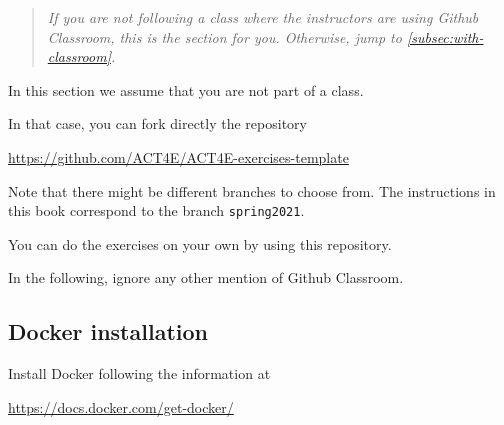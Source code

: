 \begin{quote}
  \emph{
    If you are \emph{not} following a class where the instructors are using Github Classroom,
    this is the section for you. Otherwise, jump to \cref{subsec:with-classroom}.
  }
\end{quote}

In this section we assume that you are not part of a class.

In that case, you can fork directly the repository

\url{https://github.com/ACT4E/ACT4E-exercises-template}

Note that there might be different branches to choose from. The instructions in this book correspond to
the branch \texttt{spring2021}.

You can do the exercises on your own by using this repository.

In the following, ignore any other mention of Github Classroom.

\subsection{Docker installation}

Install Docker following the information at

\url{https://docs.docker.com/get-docker/}



